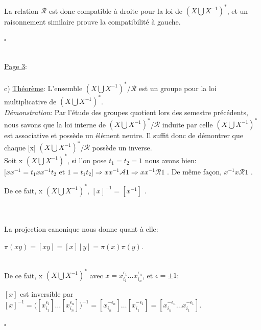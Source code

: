 \documentclass{article}
\begin{document}
\\
La relation $\mathcal{R}$ est donc compatible à droite pour la loi de $(X\bigcup X^{-1})^{*}$, et un raisonnement similaire prouve la compatibilité à gauche.
\begin{flushright}
        $\square$
\end{flushright}
\\

\underline{Page 3}:\\

\\ \parindent 0mm c) \underline{Théorème}:
L'ensemble $(X\bigcup X^{-1})^{*}$/$\mathcal{R}$ est un groupe pour la loi multiplicative de $(X \bigcup X^{-1})^{*}$.\\

\textit{Démonstration}:
Par l'étude des groupes quotient lors des semestre précédents, nous savons que la loi interne de $(X \bigcup X^{-1})^{*}$/$\mathcal{R}$ induite par celle $(X\bigcup X^{-1})^{*}$ est associative et possède un élément neutre. Il suffit donc de démontrer que chaque [x] \in $ (X \bigcup X^{-1})^{*}$/$\mathcal{R}$ possède un inverse.\\
Soit x \in $ (X \bigcup X^{-1})^{*}$, si l'on pose $t_1=t_2=1$ nous avons bien:\\
$\bigr[xx^{-1}=t_1xx^{-1}t_2$ et $1=t_1t_2\bigr] \Rightarrow xx^{-1}\mathcal{A}1 \Rightarrow xx^{-1}\mathcal{R}1$ . De même façon, $x^{-1}x\mathcal{R}1$ .
\begin{center}
De ce fait, \forall x \in $ (X \bigcup X^{-1})^{*}$, $[x]^{-1}=[x^{-1}]$ .   
\end{center}\\
\\
La projection canonique nous donne quant à elle:
\begin{center}
    $\pi(xy) = [xy] = [x][y] = \pi(x)\pi(y)$.
\end{center}\\

De ce fait, \forall x \in $(X \bigcup X^{-1})^{*}$ avec
    $x=x^{\epsilon_1}_{i_1}\dots x^{\epsilon_n}_{i_n}$, et $\epsilon=\pm1$: 

\begin{center}
    $[x]$ est inversible par $[x]^{-1}=\bigr([x^{\epsilon_1}_{i_1}]\dots [x^{\epsilon_n}_{i_n}]\bigr)^{-1}=[x^{-\epsilon_n}_{i_n}]\dots[x^{-\epsilon_1}_{i_1}]=[x^{-\epsilon_n}_{i_n} \dots x^{-\epsilon_1}_{i_1}]$. 
\end{center}
\begin{flushright}
$\square$
\end{flushright}\\
\end{document}
